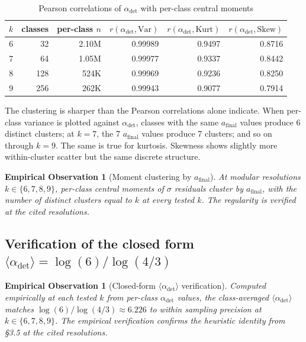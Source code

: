 \documentclass{article}
\newtheorem{observation}[theorem]{Empirical Observation}
\theoremstyle{plain}
\begin{document}
\begin{table}[ht]
\centering
\caption{Pearson correlations of $\alpha_{\text{det}}$ with per-class central moments}
\label{tab:central-moments}
\begin{tabular}{rrrrrr}
\toprule
$k$ & classes & per-class $n$ & $r(\alpha_{\text{det}}, \text{Var})$ & $r(\alpha_{\text{det}}, \text{Kurt})$ & $r(\alpha_{\text{det}}, \text{Skew})$ \\
\midrule
6 & 32 & 2.10M & 0.99989 & 0.9497 & 0.8716 \\
7 & 64 & 1.05M & 0.99977 & 0.9337 & 0.8442 \\
8 & 128 & 524K & 0.99969 & 0.9236 & 0.8250 \\
9 & 256 & 262K & 0.99943 & 0.9077 & 0.7914 \\
\bottomrule
\end{tabular}
\end{table}

The clustering is sharper than the Pearson correlations alone indicate. When per-class variance is plotted against $\alpha_{\text{det}}$, classes with the same $a_{\text{final}}$ values produce 6 distinct clusters; at $k=7$, the 7 $a_{\text{final}}$ values produce 7 clusters; and so on through $k=9$. The same is true for kurtosis. Skewness shows slightly more within-cluster scatter but the same discrete structure.

\begin{observation}[Moment clustering by $a_{\text{final}}$]
\label{obs:moment-clustering}
At modular resolutions $k \in \{6, 7, 8, 9\}$, per-class central moments of $\sigma$ residuals cluster by $a_{\text{final}}$, with the number of distinct clusters equal to $k$ at every tested $k$. The regularity is verified at the cited resolutions.
\end{observation}

\subsection{Verification of the closed form $\langle \alpha_{\text{det}} \rangle = \log(6)/ \log(4/3)$}
\begin{observation}[Closed-form $\langle \alpha_{\text{det}} \rangle$ verification]
\label{obs:closed-form-verification}
Computed empirically at each tested $k$ from per-class $\alpha_{\text{det}}$ values, the class-averaged $\langle \alpha_{\text{det}} \rangle$ matches $\log(6)/ \log(4/3) \approx 6.226$ to within sampling precision at $k \in \{6, 7, 8, 9\}$. The empirical verification confirms the heuristic identity from \S3.5 at the cited resolutions.
\end{observation}
\end{document}
